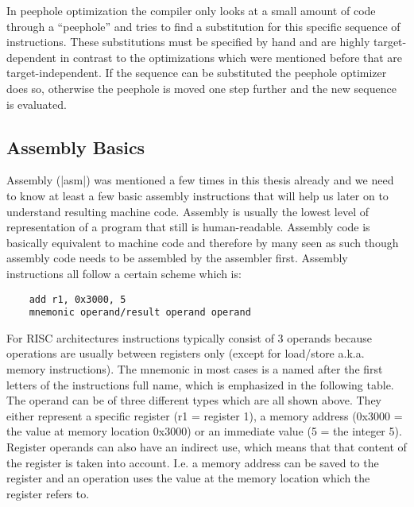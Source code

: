 In peephole optimization the compiler only looks at a small amount of code through a ``peephole'' and tries to find a substitution for this specific sequence of instructions.
These substitutions must be specified by hand and are highly target-dependent in contrast to the optimizations which were mentioned before that are target-independent.
If the sequence can be substituted the peephole optimizer does so, otherwise the peephole is moved one step further and the new sequence is evaluated.

\subsection{Assembly Basics}
\label{section:asm}
Assembly (|asm|) was mentioned a few times in this thesis already and we need to know at least a few basic assembly instructions that will help us later on to understand resulting machine code.
Assembly is usually the lowest level of representation of a program that still is human-readable.
Assembly code is basically equivalent to machine code and therefore by many seen as such though assembly code needs to be assembled by the assembler first.
Assembly instructions all follow a certain scheme which is:
\begin{lstlisting}
    add r1, 0x3000, 5
    mnemonic operand/result operand operand
\end{lstlisting}
For RISC architectures instructions typically consist of 3 operands because operations are usually between registers only (except for load/store a.k.a. memory instructions).
The mnemonic in most cases is a named after the first letters of the instructions full name, which is emphasized in the following table.
The operand can be of three different types which are all shown above.
They either represent a specific register (r1 = register 1), a memory address (0x3000 = the value at memory location 0x3000) or an immediate value (5 = the integer 5).
Register operands can also have an indirect use, which means that that content of the register is taken into account.
I.e. a memory address can be saved to the register and an operation uses the value at the memory location which the register refers to.

